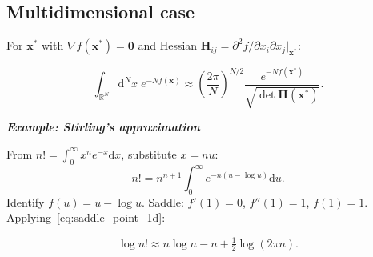 \documentclass[justified,notoc]{tufte-handout}
\def\d{\mathrm{d}}
\renewcommand{\vec}[1]{\mathbf{#1}}
\begin{document}
\begin{marginfigure}
\centering
{}
\caption{As $N$ grows, $e^{-Nf(x)}$ concentrates ever more sharply near $x^*$. The saddle-point approximation replaces $f$ with its quadratic expansion around $x^*$.}
\label{fig:saddle_point}
\end{marginfigure}

\subsection{Multidimensional case}

For $\vec{x}^*$ with $\nabla f(\vec{x}^*)=\vec{0}$ and Hessian $\mathbf{H}_{ij}=\partial^2 f/\partial x_i\partial x_j|_{\vec{x}^*}$:
\begin{keyresult}
\begin{equation}
  \int_{\mathbb{R}^N}\d^N\!x\;e^{-Nf(\vec{x})}
  \approx\left(\frac{2\pi}{N}\right)^{N/2}\frac{e^{-Nf(\vec{x}^*)}}{\sqrt{\det\mathbf{H}(\vec{x}^*)}}.
  \label{eq:saddle_point_Nd}
\end{equation}
\end{keyresult}

\noindent\textit{\textbf{Example: Stirling's approximation}}\quad

From $n!=\int_0^\infty x^n e^{-x}\d x$, substitute $x=nu$:
\begin{equation}
  n!=n^{n+1}\int_0^\infty e^{-n(u-\log u)}\d u.
\end{equation}
Identify $f(u)=u-\log u$. Saddle: $f'(1)=0$, $f''(1)=1$, $f(1)=1$. Applying~\eqref{eq:saddle_point_1d}:
\begin{keyresult}
\begin{equation}
  \log n!\approx n\log n-n+\tfrac{1}{2}\log(2\pi n).
\end{equation}
\end{keyresult}
\end{document}
